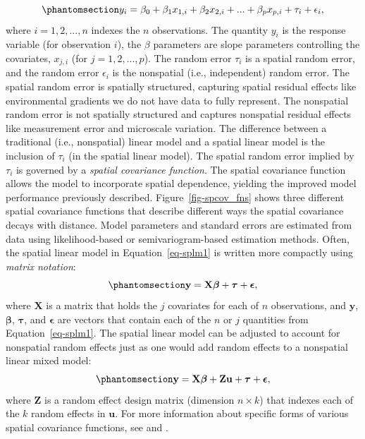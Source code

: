\documentclass[
  letterpaper,
  DIV=11,
  numbers=noendperiod]{scrartcl}
\begin{document}
\begin{equation}\phantomsection\label{eq-splm1}{
y_i = \beta_0 + \beta_1x_{1, i} + \beta_2x_{2, i} + ... + \beta_p x_{p, i} + \tau_i + \epsilon_i,
}\end{equation} where \(i = 1, 2, ..., n\) indexes the \(n\)
observations. The quantity \(y_i\) is the response variable (for
observation \(i\)), the \(\beta\) parameters are slope parameters
controlling the covariates, \(x_{j, i}\) (for \(j = 1, 2, ..., p\)). The
random error \(\tau_i\) is a spatial random error, and the random error
\(\epsilon_i\) is the nonspatial (i.e., independent) random error. The
spatial random error is spatially structured, capturing spatial residual
effects like environmental gradients we do not have data to fully
represent. The nonspatial random error is not spatially structured and
captures nonspatial residual effects like measurement error and
microscale variation. The difference between a traditional (i.e.,
nonspatial) linear model and a spatial linear model is the inclusion of
\(\tau_i\) (in the spatial linear model). The spatial random error
implied by \(\tau_i\) is governed by a \emph{spatial covariance
function}. The spatial covariance function allows the model to
incorporate spatial dependence, yielding the improved model performance
previously described. Figure~\ref{fig-spcov_fns} shows three different
spatial covariance functions that describe different ways the spatial
covariance decays with distance. Model parameters and standard errors
are estimated from data using likelihood-based
\citep{patterson1971recovery, harville1977maximum, wolfinger1994computing}
or semivariogram-based \citep{cressie1985fitting, curriero1999composite}
estimation methods. Often, the spatial linear model in
Equation~\ref{eq-splm1} is written more compactly using \emph{matrix
notation}: \begin{equation}\phantomsection\label{eq-splm2}{
\mathbf{y} = \mathbf{X} \boldsymbol{\beta} + \boldsymbol{\tau} + \boldsymbol{\epsilon},
}\end{equation} where \(\mathbf{X}\) is a matrix that holds the \(j\)
covariates for each of \(n\) observations, and \(\mathbf{y}\),
\(\boldsymbol{\beta}\), \(\boldsymbol{\tau}\), and
\(\boldsymbol{\epsilon}\) are vectors that contain each of the \(n\) or
\(j\) quantities from Equation~\ref{eq-splm1}. The spatial linear model
can be adjusted to account for nonspatial random effects just as one
would add random effects to a nonspatial linear mixed model:
\begin{equation}\phantomsection\label{eq-splm3}{
\mathbf{y} = \mathbf{X} \boldsymbol{\beta} + \mathbf{Z}\mathbf{u} + \boldsymbol{\tau} + \boldsymbol{\epsilon},
}\end{equation} where \(\mathbf{Z}\) is a random effect design matrix
(dimension \(n \times k\)) that indexes each of the \(k\) random effects
in \(\mathbf{u}\). For more information about specific forms of various
spatial covariance functions, see \citet{schabenberger2017statistical}
and \citet{zimmerman2024spatial}.
\end{document}
